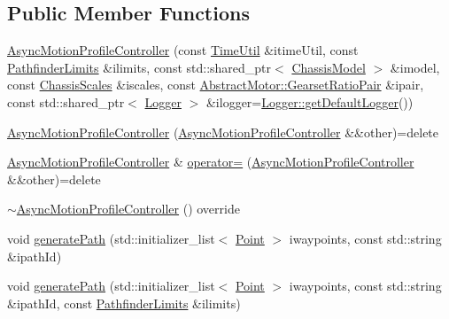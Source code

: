 \subsection*{Public Member Functions}
\begin{DoxyCompactItemize}
\item 
\mbox{\hyperlink{classokapi_1_1AsyncMotionProfileController_a7552d4d18213b79ec0fc0e65a3294305}{Async\+Motion\+Profile\+Controller}} (const \mbox{\hyperlink{classokapi_1_1TimeUtil}{Time\+Util}} \&itime\+Util, const \mbox{\hyperlink{structokapi_1_1PathfinderLimits}{Pathfinder\+Limits}} \&ilimits, const std\+::shared\+\_\+ptr$<$ \mbox{\hyperlink{classokapi_1_1ChassisModel}{Chassis\+Model}} $>$ \&imodel, const \mbox{\hyperlink{classokapi_1_1ChassisScales}{Chassis\+Scales}} \&iscales, const \mbox{\hyperlink{structokapi_1_1AbstractMotor_1_1GearsetRatioPair}{Abstract\+Motor\+::\+Gearset\+Ratio\+Pair}} \&ipair, const std\+::shared\+\_\+ptr$<$ \mbox{\hyperlink{classokapi_1_1Logger}{Logger}} $>$ \&ilogger=\mbox{\hyperlink{classokapi_1_1Logger_a5053cf778b4b55acba788a3797dc96d2}{Logger\+::get\+Default\+Logger}}())
\item 
\mbox{\hyperlink{classokapi_1_1AsyncMotionProfileController_ad5c9863c0a6be7c6b333703d8e778399}{Async\+Motion\+Profile\+Controller}} (\mbox{\hyperlink{classokapi_1_1AsyncMotionProfileController}{Async\+Motion\+Profile\+Controller}} \&\&other)=delete
\item 
\mbox{\hyperlink{classokapi_1_1AsyncMotionProfileController}{Async\+Motion\+Profile\+Controller}} \& \mbox{\hyperlink{classokapi_1_1AsyncMotionProfileController_adb67189604f463a2cdc719a59baa128c}{operator=}} (\mbox{\hyperlink{classokapi_1_1AsyncMotionProfileController}{Async\+Motion\+Profile\+Controller}} \&\&other)=delete
\item 
\mbox{\hyperlink{classokapi_1_1AsyncMotionProfileController_ad39490ab331f47d969eb484c4d5c63e1}{$\sim$\+Async\+Motion\+Profile\+Controller}} () override
\item 
void \mbox{\hyperlink{classokapi_1_1AsyncMotionProfileController_a767919702ab379bac5273010baf03cda}{generate\+Path}} (std\+::initializer\+\_\+list$<$ \mbox{\hyperlink{structokapi_1_1Point}{Point}} $>$ iwaypoints, const std\+::string \&ipath\+Id)
\item 
void \mbox{\hyperlink{classokapi_1_1AsyncMotionProfileController_ada198a8805433f0ed8608577dc83dc5f}{generate\+Path}} (std\+::initializer\+\_\+list$<$ \mbox{\hyperlink{structokapi_1_1Point}{Point}} $>$ iwaypoints, const std\+::string \&ipath\+Id, const \mbox{\hyperlink{structokapi_1_1PathfinderLimits}{Pathfinder\+Limits}} \&ilimits)

\end{DoxyCompactItemize}

